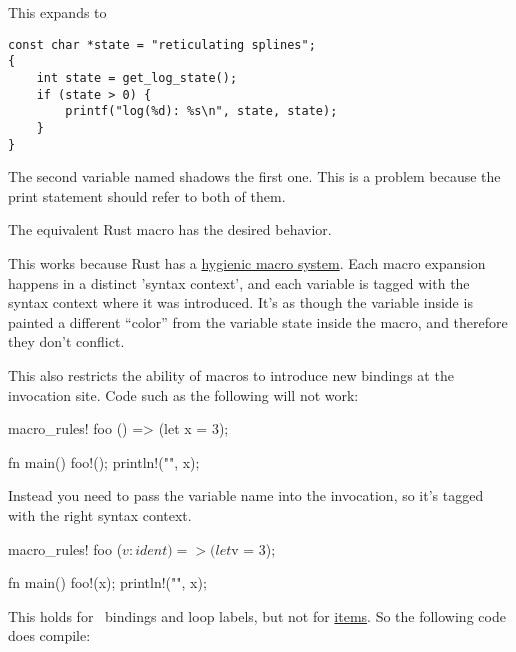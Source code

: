 This expands to

\begin{verbatim}
const char *state = "reticulating splines";
{
    int state = get_log_state();
    if (state > 0) {
        printf("log(%d): %s\n", state, state);
    }
}
\end{verbatim}

The second variable named  shadows the first one. This is a problem because the print statement should refer to both of them.

\blank

The equivalent Rust macro has the desired behavior.


This works because Rust has a \href{https://en.wikipedia.org/wiki/Hygienic_macro}{hygienic macro system}. Each macro expansion happens 
in a distinct 'syntax context', and each variable is tagged with the syntax context where it was introduced. It's as though the variable 
 inside  is painted a different \enquote{color} from the variable state inside the macro, and therefore they 
don't conflict.

\blank

This also restricts the ability of macros to introduce new bindings at the invocation site. Code such as the following will not work:

\begin{rustc}
macro_rules! foo {
    () => (let x = 3);
}

fn main() {
    foo!();
    println!("{}", x);
}
\end{rustc}

Instead you need to pass the variable name into the invocation, so it's tagged with the right syntax context.

\begin{rustc}
macro_rules! foo {
    ($v:ident) => (let $v = 3);
}

fn main() {
    foo!(x);
    println!("{}", x);
}
\end{rustc}

This holds for \keylet\ bindings and loop labels, but not for \href{https://doc.rust-lang.org/reference.html#items}{items}. So the 
following code does compile:

